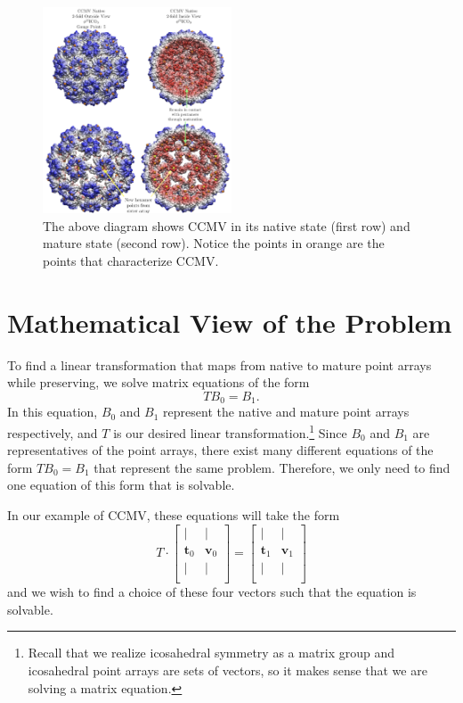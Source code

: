 \documentclass[a4paper,10pt]{article}
\theoremstyle{plain}
\theoremstyle{definition}
\theoremstyle{remark}
\renewcommand{\vec}[1]{\textbf{#1}}
\begin{document}
\begin{figure}[!h]
	\centering
	\captionsetup{width=0.5\textwidth}
	\includegraphics[width=0.5\textwidth]{images/CCMV_maturation.png}
	\caption{The above diagram shows CCMV in its native state (first row) and mature state (second row). Notice the points in orange are the points that characterize CCMV.}
	\label{fig:CCMV_maturation}
\end{figure}

\section{Mathematical View of the Problem}
To find a linear transformation that maps from native to mature point arrays while preserving, we solve matrix equations of the form \[TB_0 = B_1.\]
In this equation, \(B_0\) and \(B_1\) represent the native and mature point arrays respectively, and \(T\) is our desired linear transformation.\footnote{Recall that we realize icosahedral symmetry as a matrix group and icosahedral point arrays are sets of vectors, so it makes sense that we are solving a matrix equation.}
Since \(B_0\) and \(B_1\) are representatives of the point arrays, there exist many different equations of the form \(TB_0 = B_1\) that represent the same problem.
Therefore, we only need to find one equation of this form that is solvable.

In our example of CCMV, these equations will take the form \[T\cdot \begin{bmatrix}
    | & | \\
    \vec{t}_0 & \vec{v}_0 \\
    | & | \\
\end{bmatrix} = \begin{bmatrix}
    | & | \\
    \vec{t}_1 & \vec{v}_1 \\
    | & | \\
\end{bmatrix}\]
and we wish to find a choice of these four vectors such that the equation is solvable.
\end{document}
